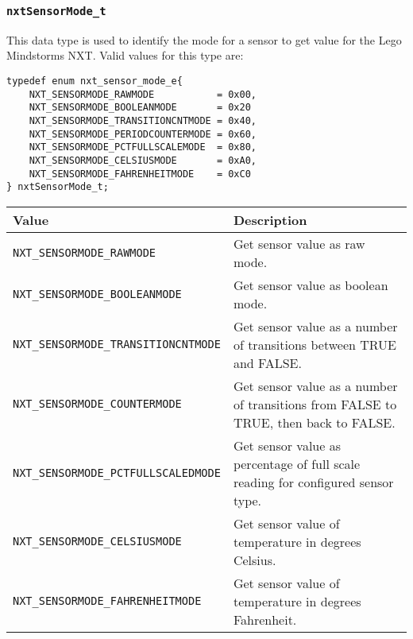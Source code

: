 \subsubsection{\label{sec:nxtSensorMode_t}{\tt nxtSensorMode\_t}}
This data type is used to identify the mode for a sensor to get value for the 
Lego Mindstorms NXT. Valid values for this type are:
\begin{lstlisting}
typedef enum nxt_sensor_mode_e{
    NXT_SENSORMODE_RAWMODE           = 0x00,
    NXT_SENSORMODE_BOOLEANMODE       = 0x20
    NXT_SENSORMODE_TRANSITIONCNTMODE = 0x40,
    NXT_SENSORMODE_PERIODCOUNTERMODE = 0x60,
    NXT_SENSORMODE_PCTFULLSCALEMODE  = 0x80,
    NXT_SENSORMODE_CELSIUSMODE       = 0xA0,
    NXT_SENSORMODE_FAHRENHEITMODE    = 0xC0
} nxtSensorMode_t;
\end{lstlisting}

\noindent
\begin{longtable}{p{6cm}p{9.5cm}} 
    \hline
    Value & Description\\
    \hline
    {\tt NXT\_SENSORMODE\_RAWMODE}      &Get sensor value as raw mode.\\	 
    {\tt NXT\_SENSORMODE\_BOOLEANMODE}  &Get sensor value as boolean mode.\\
    {\tt NXT\_SENSORMODE\_TRANSITIONCNTMODE}  &Get sensor value as a number of 
    transitions between TRUE and FALSE.\\
    {\tt NXT\_SENSORMODE\_COUNTERMODE}  &Get sensor value as a number of 
    transitions from FALSE to TRUE, then back to FALSE.\\
    {\tt NXT\_SENSORMODE\_PCTFULLSCALEDMODE}  &Get sensor value as percentage of 
    full scale reading for configured sensor type.\\
    {\tt NXT\_SENSORMODE\_CELSIUSMODE}  &Get sensor value of temperature in 
    degrees Celsius.\\
    {\tt NXT\_SENSORMODE\_FAHRENHEITMODE}  &Get sensor value of temperature in 
    degrees Fahrenheit.\\
    \hline
\end{longtable}


